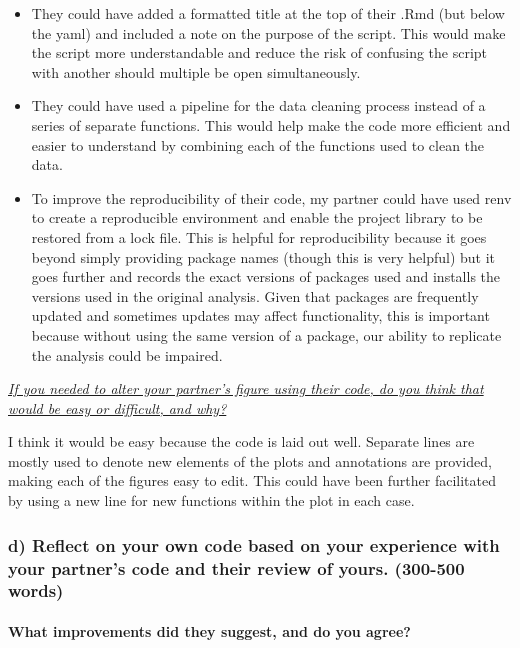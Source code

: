 \documentclass[
]{article}
\begin{document}
\begin{itemize}
\item
  They could have added a formatted title at the top of their .Rmd (but
  below the yaml) and included a note on the purpose of the script. This
  would make the script more understandable and reduce the risk of
  confusing the script with another should multiple be open
  simultaneously.
\item
  They could have used a pipeline for the data cleaning process instead
  of a series of separate functions. This would help make the code more
  efficient and easier to understand by combining each of the functions
  used to clean the data.
\item
  To improve the reproducibility of their code, my partner could have
  used renv to create a reproducible environment and enable the project
  library to be restored from a lock file. This is helpful for
  reproducibility because it goes beyond simply providing package names
  (though this is very helpful) but it goes further and records the
  exact versions of packages used and installs the versions used in the
  original analysis. Given that packages are frequently updated and
  sometimes updates may affect functionality, this is important because
  without using the same version of a package, our ability to replicate
  the analysis could be impaired.
\end{itemize}

\ul{\emph{If you needed to alter your partner's figure using their code,
do you think that would be easy or difficult, and why?}}

I think it would be easy because the code is laid out well. Separate
lines are mostly used to denote new elements of the plots and
annotations are provided, making each of the figures easy to edit. This
could have been further facilitated by using a new line for new
functions within the plot in each case. ~

\subsubsection{d) Reflect on your own code based on your experience with
your partner's code and their review of yours. (300-500
words)}\label{d-reflect-on-your-own-code-based-on-your-experience-with-your-partners-code-and-their-review-of-yours.-300-500-words}

\paragraph{What improvements did they suggest, and do you
agree?}\label{what-improvements-did-they-suggest-and-do-you-agree}
\end{document}
